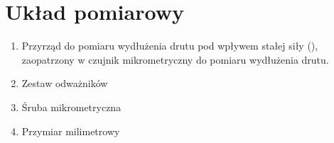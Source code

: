 \section{Układ pomiarowy}
\begin{enumerate}
    \item Przyrząd do pomiaru wydłużenia drutu pod wpływem stałej siły (), zaopatrzony w czujnik mikrometryczny do pomiaru wydłużenia drutu.
    \item Zestaw odważników
    \item Śruba mikrometryczna
    \item Przymiar milimetrowy
\end{enumerate}


